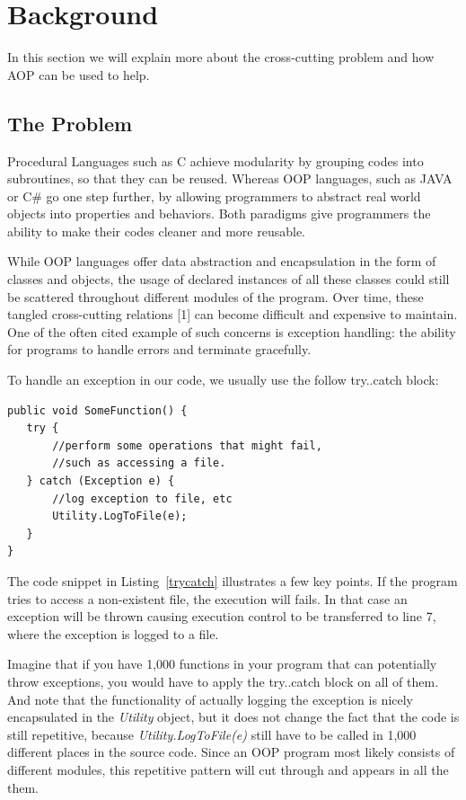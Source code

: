 \section{Background}
In this section we will explain more about the cross-cutting problem and how AOP can be used to help.

\subsection{The Problem}
Procedural Languages such as C achieve modularity by grouping codes into subroutines, so that they can be reused. Whereas OOP languages, such as JAVA or C\# go one step further, by allowing programmers to abstract real world objects into properties and behaviors. Both paradigms give programmers the ability to make their codes cleaner and more reusable.

While OOP languages offer data abstraction and encapsulation in the form of classes and objects, the usage of declared instances of all these classes could still be scattered throughout different modules of the program. Over time, these tangled cross-cutting relations [1] can become difficult and expensive to maintain. One of the often cited example of such concerns is exception handling: the ability for programs to handle errors and terminate gracefully.

To handle an exception in our code, we usually use the follow try..catch block:

\begin{lstlisting}[caption={try..catch pattern}, label=trycatch]
public void SomeFunction() {
   try {
       //perform some operations that might fail, 
       //such as accessing a file.
   } catch (Exception e) {
       //log exception to file, etc
       Utility.LogToFile(e);
   }
}
\end{lstlisting}

The code snippet in Listing~\ref{trycatch} illustrates a few key points. If the program tries to access a non-existent file, the execution will fails. In that case an exception will be thrown causing execution control to be transferred to line 7, where the exception is logged to a file. 

Imagine that if you have 1,000 functions in your program that can potentially throw exceptions, you would have to apply the try..catch block on all of them. And note that the functionality of actually logging the exception is nicely encapsulated in the {\em Utility} object, but it does not change the fact that the code is still repetitive, because {\em Utility.LogToFile(e)} still have to be called in 1,000 different places in the source code. Since an OOP program most likely consists of different modules, this repetitive pattern will cut through and appears in all the them.

